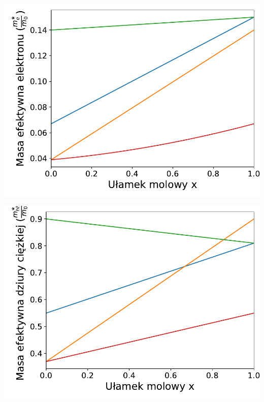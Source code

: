 \documentclass[12pt,openany,a4paper]{book}
\begin{document}
\begin{minipage}[t]{0.5\textwidth}
	\includegraphics[width = \linewidth]{Figures/ternary/m_e.pdf}\label{fig:ter_me}
\end{minipage}
\begin{minipage}[t]{0.5\textwidth}
	\includegraphics[width = \linewidth]{Figures/ternary/m_hh.pdf}\label{fig:ter_mhh}
\end{minipage}
\end{document}
